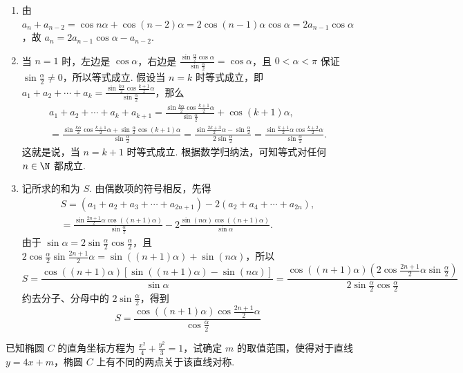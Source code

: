 \documentclass[UTF8,a4paper,oneside,11pt]{ctexbook}
\begin{document}
\begin{solution}
\begin{enumerate}
\item 由 \(a_{n}+a_{n-2}=\cos n\alpha+\cos(n-2)\alpha=2\cos(n-1)\alpha\cos\alpha=2a_{n-1}\cos\alpha\)，故 \(a_{n}=2a_{n-1}\cos\alpha-a_{n-2}\).

\item 当 \(n=1\) 时，左边是 \(\cos\alpha\)，右边是 \(\frac{\sin\frac{\alpha}{2}\cos\alpha}{\sin\frac{\alpha}{2}}=\cos\alpha\)，且 \(0<\alpha<\pi\) 保证 \(\sin\frac{\alpha}{2}\ne0\)，所以等式成立. 假设当 \(n=k\) 时等式成立，即 \(a_{1}+a_{2}+\cdots+a_{k}=\frac{\sin\frac{k\alpha}{2}\cos\frac{k+1}{2}\alpha}{\sin\frac{\alpha}{2}}\)，那么
\[
\begin{gathered}
a_{1}+a_{2}+\cdots+a_{k}+a_{k+1}=\frac{\sin\frac{k\alpha}{2}\cos\frac{k+1}{2}\alpha}{\sin\frac{\alpha}{2}}+\cos(k+1)\alpha,\\
=\frac{\sin\frac{k\alpha}{2}\cos\frac{k+1}{2}\alpha+\sin\frac{\alpha}{2}\cos(k+1)\alpha}{\sin\frac{\alpha}{2}}=\frac{\sin\frac{2k+3}{2}\alpha-\sin\frac{\alpha}{2}}{2\sin\frac{\alpha}{2}}=\frac{\sin\frac{k+1}{2}\alpha\cos\frac{k+2}{2}\alpha}{\sin\frac{\alpha}{2}}.
\end{gathered}
\] 这就是说，当 \(n=k+1\) 时等式成立. 根据数学归纳法，可知等式对任何 \(n\in\N\) 都成立.

\item 记所求的和为 \(S\). 由偶数项的符号相反，先得
\[
\begin{gathered}
S=(a_{1}+a_{2}+a_{3}+\cdots+a_{2n+1})-2(a_{2}+a_{4}+\cdots+a_{2n}),\\
=\frac{\sin\frac{2n+1}{2}\alpha\cos\left((n+1)\alpha\right)}{\sin\frac{\alpha}{2}}-2\frac{\sin(n\alpha)\cos\left((n+1)\alpha\right)}{\sin\alpha}.
\end{gathered}
\]
由于 \(\sin\alpha=2\sin\frac{\alpha}{2}\cos\frac{\alpha}{2}\)，且 \(2\cos\frac{\alpha}{2}\sin\frac{2n+1}{2}\alpha=\sin\left((n+1)\alpha\right)+\sin(n\alpha)\)，所以
\[
S=\frac{\cos\left((n+1)\alpha\right)\left[\sin\left((n+1)\alpha\right)-\sin(n\alpha)\right]}{\sin\alpha}=\frac{\cos\left((n+1)\alpha\right)\left(2\cos\frac{2n+1}{2}\alpha\sin\frac{\alpha}{2}\right)}{2\sin\frac{\alpha}{2}\cos\frac{\alpha}{2}}
\]
约去分子、分母中的 \(2\sin\frac{\alpha}{2}\)，得到
\[
S=\frac{\cos\left((n+1)\alpha\right)\cos\frac{2n+1}{2}\alpha}{\cos\frac{\alpha}{2}}
\]
\end{enumerate}
\end{solution}

\begin{problem}

已知椭圆 \(C\) 的直角坐标方程为 \(\frac{x^2}{4} + \frac{y^2}{3} = 1\)，试确定 \(m\) 的取值范围，使得对于直线 \(y = 4x + m\)，椭圆 \(C\) 上有不同的两点关于该直线对称.
\end{problem}
\end{document}
